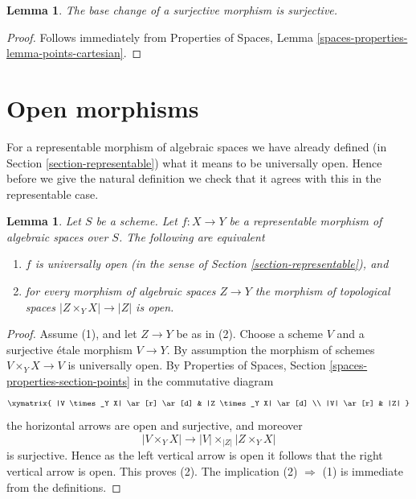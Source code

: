 \documentclass{stacks-project}
\theoremstyle{plain}
\newtheorem{lemma}[subsection]{Lemma}
\theoremstyle{definition}
\theoremstyle{remark}
\numberwithin{equation}{subsection}
\begin{document}
\begin{lemma}
\label{lemma-base-change-surjective}
The base change of a surjective morphism is surjective.
\end{lemma}

\begin{proof}
Follows immediately from
Properties of Spaces, Lemma \ref{spaces-properties-lemma-points-cartesian}.
\end{proof}










\section{Open morphisms}
\label{section-open}

\noindent
For a representable morphism of algebraic spaces we have already defined (in
Section \ref{section-representable})
what it means to be universally open. Hence before we give the natural
definition we check that it agrees with this in the representable case.

\begin{lemma}
\label{lemma-characterize-representable-universally-open}
Let $S$ be a scheme. Let $f : X \to Y$ be a representable morphism of
algebraic spaces over $S$. The following are equivalent
\begin{enumerate}
\item $f$ is universally open
(in the sense of Section \ref{section-representable}), and
\item for every morphism of algebraic spaces $Z \to Y$ the morphism of
topological spaces $|Z \times_Y X| \to |Z|$ is open.
\end{enumerate}
\end{lemma}

\begin{proof}
Assume (1), and let $Z \to Y$ be as in (2). Choose a scheme $V$ and
a surjective \'etale morphism $V \to Y$. By assumption the morphism
of schemes $V \times_Y X \to V$ is universally open. By
Properties of Spaces, Section \ref{spaces-properties-section-points}
in the commutative diagram
$$
\xymatrix{
|V \times_Y X| \ar[r] \ar[d] & |Z \times_Y X| \ar[d] \\
|V| \ar[r] & |Z|
}
$$
the horizontal arrows are open and surjective, and moreover
$$
|V \times_Y X| \longrightarrow |V| \times_{|Z|} |Z \times_Y X|
$$
is surjective. Hence as the left
vertical arrow is open it follows that the right vertical arrow is
open. This proves (2). The implication (2) $\Rightarrow$ (1) is
immediate from the definitions.
\end{proof}
\end{document}
